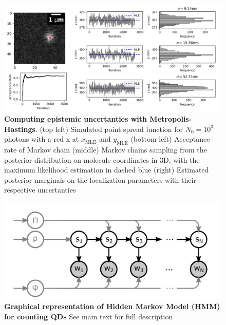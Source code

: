 \documentclass{ucetd}
\begin{document}
\begin{figure}
\begin{center}
\includegraphics[width=16cm]{MCMC.png}
\end{center}
\caption{\textbf{Computing epistemic uncertanties with Metropolis-Hastings}. (top left) Simulated point spread function for $N_{0}=10^{3}$ photons with a red x at $x_{\mathrm{MLE}}$ and $y_{\mathrm{MLE}}$ (bottom left) Acceptance rate of Markov chain (middle) Markov chains sampling from the posterior distribution on molecule coordinates in 3D, with the maximum likelihood estimation in dashed blue (right) Estimated posterior marginals on the localization parameters with their respective uncertanties}
\end{figure}

\begin{figure}
\begin{center}
\includegraphics[width=14cm]{HMM.png}
\end{center}
\caption{\textbf{Graphical representation of Hidden Markov Model (HMM) for counting QDs} See main text for full description}
\end{figure}


\end{document}
